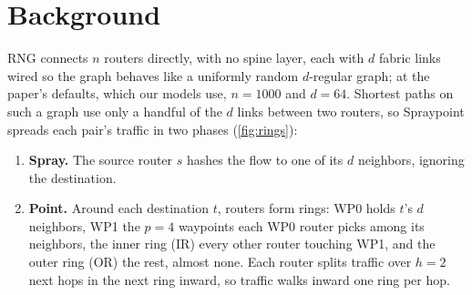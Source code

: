\section{Background}
\label{sec:background}

RNG connects $n$ routers directly, with no spine layer, each with $d$ fabric links wired so the graph behaves like a uniformly random $d$-regular graph; at the paper's defaults, which our models use, $n = 1000$ and $d = 64$. Shortest paths on such a graph use only a handful of the $d$ links between two routers, so Spraypoint spreads each pair's traffic in two phases (\autoref{fig:rings}):
\begin{enumerate}
  \item \textbf{Spray.} The source router $s$ hashes the flow to one of its $d$ neighbors, ignoring the destination.
  \item \textbf{Point.} Around each destination $t$, routers form rings: WP0 holds $t$'s $d$ neighbors, WP1 the $p = 4$ waypoints each WP0 router picks among its neighbors, the inner ring (IR) every other router touching WP1, and the outer ring (OR) the rest, almost none. Each router splits traffic over $h = 2$ next hops in the next ring inward, so traffic walks inward one ring per hop.
\end{enumerate}

